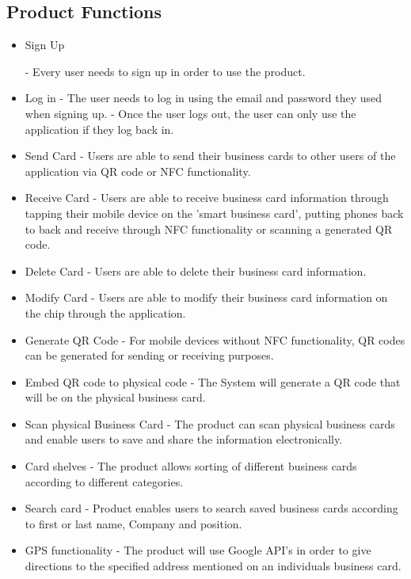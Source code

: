 \documentclass[english]{article}
\begin{document}
				\subsection{Product Functions}
				\begin{itemize} 
					\item Sign Up
					
					\subitem
					- Every user needs to sign up in order to use the product.
					\item
					Log in
					\subitem
					- The user needs to log in using the email and password they used when signing up.
					\subitem 
					- Once the user logs out, the user can only use the application if they log back in.
					\item 
					Send Card
					\subitem
					- Users are able to send their business cards to other users of the application via QR code or NFC functionality.
					\item
					Receive Card
					\subitem
					- Users are able to receive business card information through tapping their mobile device on the 'smart business card', putting phones back to back and receive through NFC functionality or scanning a generated QR code.
					\item 
					Delete Card
					\subitem
					- Users are able to delete their business card information.
					\item
					Modify Card
					\subitem
					- Users are able to modify their business card information on the chip through the application.
					\item
					Generate QR Code
					\subitem
					- For mobile devices without NFC functionality, QR codes can be generated for sending or receiving purposes.
					\item
					Embed QR code to physical code
					\subitem
					- The System will generate a QR code that will be on the physical business card.
					\item
					Scan physical Business Card
					\subitem
					- The product can scan physical business cards and enable users to save and share the information electronically.
					\item
					Card shelves
					\subitem
					- The product allows sorting of different business cards according to different categories.
					
					\item
					Search card
					\subitem
					- Product enables users to search saved business cards according to first or last name, Company and position.
					\item
					GPS functionality	
					\subitem
					- The product will use Google API's in order to give directions to the specified address mentioned on an individuals business card.
				\end{itemize}
\end{document}
